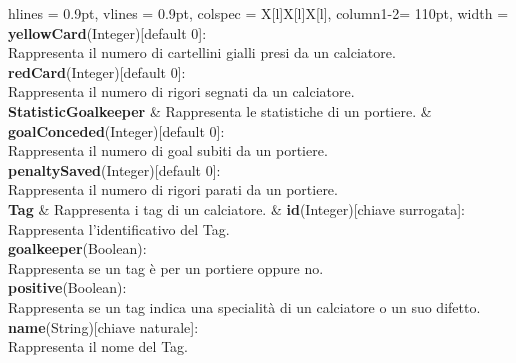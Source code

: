 \begin{tblr}{
    hlines = {0.9pt}, vlines = {0.9pt}, colspec = {X[l]X[l]X[l]}, column{1-2}= {110pt},
    width = \textwidth
}
{		\medskip\textbf{yellowCard}(Integer)[default 0]:\\
			Rappresenta il numero di cartellini gialli
			presi da un calciatore.\\
		\medskip\textbf{redCard}(Integer)[default 0]:\\
			Rappresenta il numero di rigori segnati
			da un calciatore.
	}
	\\
	{
		\textbf{StatisticGoalkeeper}
	}
	&
	{
		Rappresenta le statistiche di un portiere.
	}
	&
	{
		\textbf{goalConceded}(Integer)[default 0]:\\
			Rappresenta il numero di goal subiti
			da un portiere.\\
		\medskip\textbf{penaltySaved}(Integer)[default 0]:\\
			Rappresenta il numero di rigori parati
			da un portiere.
	}
	\\
	{
		\textbf{Tag}
	}
	&
	{
		Rappresenta i tag di un calciatore.
	}
	&
	{
		\textbf{id}(Integer)[chiave surrogata]:\\Rappresenta
			l'identificativo del Tag.\\
		\medskip\textbf{goalkeeper}(Boolean):\\
			Rappresenta se un tag è per un portiere oppure no.\\
		\medskip\textbf{positive}(Boolean):\\
			Rappresenta se un tag indica una specialità
			di un calciatore o un suo difetto.\\
		\medskip\textbf{name}(String)[chiave naturale]:
			\\Rappresenta il nome del Tag.
	}
	\\
\end{tblr}

\newpage

